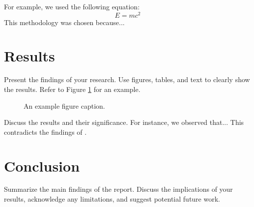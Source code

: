 \documentclass{article}
\begin{document}
For example, we used the following equation:
\[ E = mc^2 \]
This methodology was chosen because...

\section{Results}
Present the findings of your research. Use figures, tables, and text to clearly show the results.
Refer to Figure \ref{fig:example} for an example.

\begin{figure}[htbp] %
    \centering
    \caption{An example figure caption.}
    \label{fig:example}
\end{figure}

Discuss the results and their significance. For instance, we observed that... This contradicts the findings of \cite{dummy_key2}.

\section{Conclusion}
Summarize the main findings of the report. Discuss the implications of your results, acknowledge any limitations, and suggest potential future work.

\end{document}
